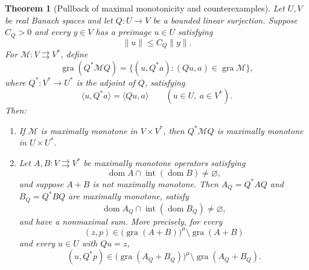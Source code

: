\documentclass[11pt]{article}
\newcommand{\gra}{\operatorname{gra}}
\newcommand{\dom}{\operatorname{dom}}
\newcommand{\pair}[2]{\langle #1,#2\rangle}
\newtheorem{theorem}{Theorem}
\theoremstyle{definition}
\theoremstyle{remark}
\begin{document}
\begin{theorem}[Pullback of maximal monotonicity and counterexamples]
\label{lem:surjection-transport}
Let $U,V$ be real Banach spaces and let $Q:U\to V$ be a bounded linear surjection. Suppose $C_Q>0$ and every $y\in V$ has a preimage $u\in U$ satisfying
\[
\|u\|\le C_Q\|y\|.
\]
For $\mathcal M:V\rightrightarrows V^*$, define
\[
\gra(Q^*\mathcal M Q)
=
\{(u,Q^*a):(Qu,a)\in\gra\mathcal M\},
\]
where $Q^*:V^*\to U^*$ is the adjoint of $Q$, satisfying
\[
\pair{u}{Q^*a}=\pair{Qu}{a}
\qquad(u\in U,\ a\in V^*).
\]
Then:
\begin{enumerate}
\item\label{thm:pullback-maximality} If $\mathcal M$ is maximally monotone in $V\times V^*$, then $Q^*\mathcal M Q$ is maximally monotone in $U\times U^*$.
\item\label{thm:pullback-counterexamples} Let $A,B:V\rightrightarrows V^*$ be maximally monotone operators satisfying
\[
\dom A\cap\operatorname{int}(\dom B)\ne\varnothing,
\]
and suppose $A+B$ is not maximally monotone. Then $A_Q=Q^*AQ$ and $B_Q=Q^*BQ$ are maximally monotone, satisfy
\[
\dom A_Q\cap\operatorname{int}(\dom B_Q)\ne\varnothing,
\]
and have a nonmaximal sum. More precisely, for every
\[
(z,p)\in\bigl(\gra(A+B)\bigr)^\mu\setminus\gra(A+B)
\]
and every $u\in U$ with $Qu=z$,
\begin{equation}
(u,Q^*p)\in\bigl(\gra(A_Q+B_Q)\bigr)^\mu\setminus\gra(A_Q+B_Q).
\label{eq:pullback-witness}
\end{equation}
\end{enumerate}
\end{theorem}
\end{document}
